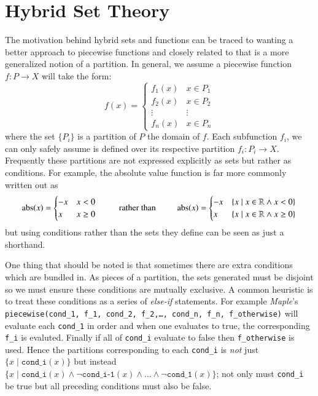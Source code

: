 \chapter{Hybrid Set Theory}


%
%


The motivation behind hybrid sets and functions can be traced to wanting a better approach to piecewise functions
and closely related to that is a more generalized notion of a partition.
In general, we assume a piecewise function $f : P \to X$ will take the form:
\begin{equation}
	\label{eq_fP}
	f(x) = 
	     \begin{cases}
	       f_1(x) & x \in P_1 \\
	       f_2(x) & x \in P_2 \\ 
	       \vdots & \vdots \\
	       f_n(x) & x \in P_n
	     \end{cases}
\end{equation}
where the set $\{ P _ i \}$ is a partition of $P$ the domain of $f$.
Each subfunction $f_i$, we can only safely assume is defined over its respective partition $f_i : P_i \to X$.
Frequently these partitions are not expressed explicitly as sets but rather as conditions.
For example, the absolute value function is far more commonly written out as
\begin{equation*}
	\text{abs}(x) = \begin{cases} -x & x < 0 \\ x & x \geq 0 \end{cases}
	\;\;\;\;\;\;\;\;\;\text{rather than}\;\;\;\;\;\;\;\;\;
	\text{abs}(x) = 
	\begin{cases}
		-x & \{x \;|\; x \in \mathbb{R} \wedge x < 0\}  \\ 
		x & \{x \;|\; x \in \mathbb{R} \wedge x \geq 0 \}
	\end{cases}
\end{equation*}
but using conditions rather than the sets they define can be seen as just a shorthand. 


One thing that should be noted is that sometimes there are extra conditions which are bundled in.
As pieces of a partition, the sets generated must be disjoint so we must ensure these conditions are mutually exclusive.
A common heuristic is to treat these conditions as a series of \emph{else-if} statements.
For example \emph{Maple}'s \texttt{piecewise(cond\_1, f\_1, cond\_2, f\_2,\ldots, cond\_n, f\_n, f\_otherwise)} will
evaluate each \texttt{cond\_1} in order and when one evaluates to true, the corresponding \texttt{f\_i} is evaluted.
Finally if all of \texttt{cond\_i} evaluate to false then \texttt{f\_otherwise} is used.
Hence the partitions corresponding to each \texttt{cond\_i} is \emph{not} just $\{ x \;|\; \texttt{cond\_i}(x) \}$
but instead 
$\{ x \;|\; \texttt{cond\_i}(x) \wedge \neg \texttt{cond\_i-1}(x) \wedge\ldots \wedge \neg \texttt{cond\_1}(x)\}$;
not only must \texttt{cond\_i} be true but all preceding conditions must also be false.


